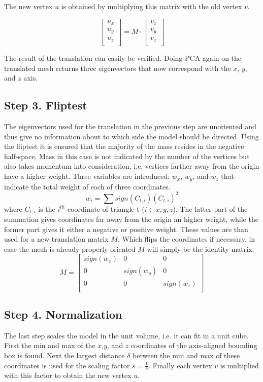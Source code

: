 \documentclass{bigdata}
\begin{document}
The new vertex $u$ is obtained by multiplying this matrix with the old vertex $v$.

\[
\begin{bmatrix}
u_x \\
u_y \\
u_z \\
\end{bmatrix}
=
M
\cdot
\begin{bmatrix}
v_x \\
v_y \\
v_z \\
\end{bmatrix}
\]

The result of the translation can easily be verified. Doing PCA again on the translated mesh returns three eigenvectors that now correspond with the $x$, $y$, and $z$ axis.

\subsection{Step 3. Fliptest}
The eigenvectors used for the translation in the previous step are unoriented and thus give no information about to which side the model should be directed. Using the fliptest it is ensured that the majority of the mass resides in the negative half-space. Mass in this case is not indicated by the number of the vertices but also takes momentum into consideration, i.e. vertices farther away from the origin have a higher weight. Three variables are introduced: $w_x$, $w_y$, and $w_z$ that indicate the total weight of each of three coordinates. 
\begin{equation}
w_i = \sum sign(C_{t,i})(C_{t,i})^2
\end{equation}
 where $C_{t,i}$ is the $i^{th}$ coordinate of triangle t ($i \in {x,y,z}$). The latter part of the summation gives coordinates far away from the origin an higher weight, while the former part gives it either a negative or positive weight. These values are than used for a new translation matrix $M$. Which flips the coordinates if necessary, in case the mesh is already properly oriented $M$ will simply be the identity matrix.
\[
M = 
\begin{bmatrix}
sign(w_x) & 0 & 0 \\
0 & sign(w_y) & 0 \\
0 & 0 & sign(w_z) \\
\end{bmatrix}
\]

\subsection{Step 4. Normalization}
The last step scales the model in the unit volume, i.e. it can fit in a unit cube. First the min and max of the $x$,$y$, and $z$ coordinates of the axis-aligned bounding box is found. Next the largest distance $\delta$ between the min and max of these coordinates is used for the scaling factor $s = \frac{1}{\delta}$. Finally each vertex $v$ is multiplied with this factor to obtain the new vertex $u$.
\end{document}
